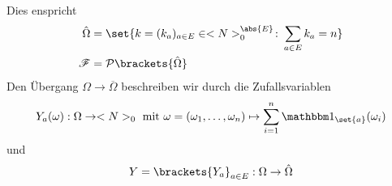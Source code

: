 \newline Dies enspricht
\begin{align}
	 \hat{\Omega} 
	 &= \set{k = (k_a)_{a \in E} \in \N_{0}^{\abs{E}} \colon \sum_{a \in E} k_a = n}\notag\\
	 \sigF &= \pows\brackets{\hat{\Omega}}\notag
\end{align}
Den Übergang $\Omega \to \overline{\Omega}$ beschreiben wir durch die Zufallsvariablen
\begin{align}
	Y_a(\omega): \Omega \to \N_{0} \mit \omega = (\omega_1,\dots, \omega_n)\mapsto \sum_{i=1}^{n} \indi_{\set{a}}(\omega_i)\notag
\end{align}
und
\begin{align}
	Y = \brackets{Y_a}_{a\in E}: \Omega \to \hat{\Omega}\notag
\end{align}

